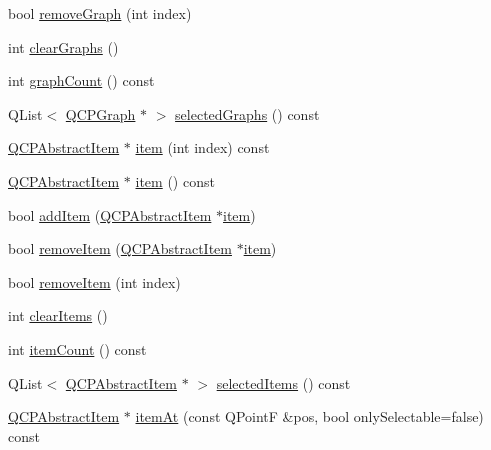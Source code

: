 \begin{DoxyCompactItemize}
\item 
bool \mbox{\hyperlink{class_q_custom_plot_a9554b3d2d5b10c0f884bd4010b6c192c}{remove\+Graph}} (int index)
\item 
int \mbox{\hyperlink{class_q_custom_plot_ab0f3abff2d2f7df3668b5836f39207fa}{clear\+Graphs}} ()
\item 
int \mbox{\hyperlink{class_q_custom_plot_a5e1787cdde868c4d3790f9ebc8207d90}{graph\+Count}} () const
\item 
Q\+List$<$ \mbox{\hyperlink{class_q_c_p_graph}{Q\+C\+P\+Graph}} $\ast$ $>$ \mbox{\hyperlink{class_q_custom_plot_ad3547aded026d8a9ae6ef13a69080d06}{selected\+Graphs}} () const
\item 
\mbox{\hyperlink{class_q_c_p_abstract_item}{Q\+C\+P\+Abstract\+Item}} $\ast$ \mbox{\hyperlink{class_q_custom_plot_ac042f2e78edd228ccf2f26b7fe215239}{item}} (int index) const
\item 
\mbox{\hyperlink{class_q_c_p_abstract_item}{Q\+C\+P\+Abstract\+Item}} $\ast$ \mbox{\hyperlink{class_q_custom_plot_a12eb2a283cf10a8a9176c01c0443e83e}{item}} () const
\item 
bool \mbox{\hyperlink{class_q_custom_plot_aa500620379262321685cb7a7674cbd2a}{add\+Item}} (\mbox{\hyperlink{class_q_c_p_abstract_item}{Q\+C\+P\+Abstract\+Item}} $\ast$\mbox{\hyperlink{class_q_custom_plot_ac042f2e78edd228ccf2f26b7fe215239}{item}})
\item 
bool \mbox{\hyperlink{class_q_custom_plot_ae04446557292551e8fb6e2c106e1848d}{remove\+Item}} (\mbox{\hyperlink{class_q_c_p_abstract_item}{Q\+C\+P\+Abstract\+Item}} $\ast$\mbox{\hyperlink{class_q_custom_plot_ac042f2e78edd228ccf2f26b7fe215239}{item}})
\item 
bool \mbox{\hyperlink{class_q_custom_plot_abcfdda3d601c0441cab136137d715dea}{remove\+Item}} (int index)
\item 
int \mbox{\hyperlink{class_q_custom_plot_abdfd07d4f0591d0cf967f85013fd3645}{clear\+Items}} ()
\item 
int \mbox{\hyperlink{class_q_custom_plot_a16025daf0341f9362be3080e404424c2}{item\+Count}} () const
\item 
Q\+List$<$ \mbox{\hyperlink{class_q_c_p_abstract_item}{Q\+C\+P\+Abstract\+Item}} $\ast$ $>$ \mbox{\hyperlink{class_q_custom_plot_afda487bcf2d6cf1a57173d82495e29ba}{selected\+Items}} () const
\item 
\mbox{\hyperlink{class_q_c_p_abstract_item}{Q\+C\+P\+Abstract\+Item}} $\ast$ \mbox{\hyperlink{class_q_custom_plot_ac08578e0e6c059c83a8d340ba0038e8e}{item\+At}} (const Q\+PointF \&pos, bool only\+Selectable=false) const

\end{DoxyCompactItemize}
